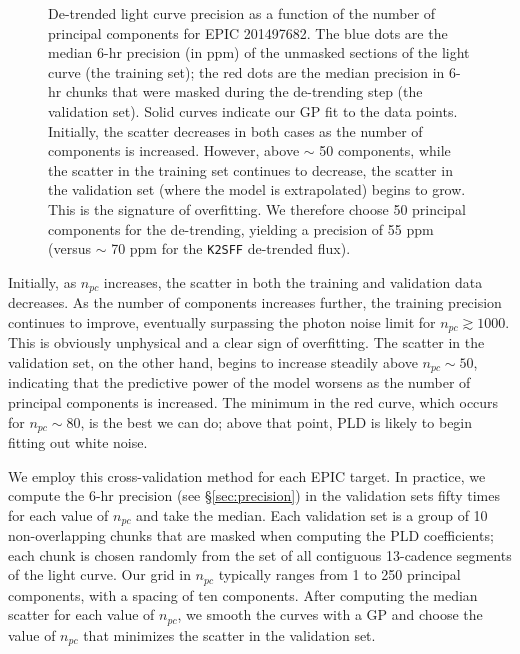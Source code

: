 \documentclass[]{emulateapj}
\begin{document}
\begin{figure}[h]
  \begin{center}
       \caption{De-trended light curve precision as a function of the number of principal
                components for EPIC 201497682. The blue dots are the median
                6-hr precision (in ppm) of the unmasked sections of the light curve (the training set); 
                the red dots are the median 
                precision in 6-hr chunks that were masked during the de-trending step
                (the validation set). Solid curves indicate our GP fit to the data points.
                Initially, the scatter decreases in both cases as the 
                number of components is increased. However, above $\sim$ 50 components, while the
                scatter in the training set continues to decrease, the scatter in the validation set (where 
                the model is extrapolated) begins to grow. This is the signature
                of overfitting. We therefore choose 50 principal components for the
                de-trending, yielding a precision of 55 ppm (versus $\sim$ 70 ppm for the
                \texttt{K2SFF} de-trended flux).}
     \label{fig:scatter}
  \end{center}
\end{figure}

Initially, as $n_{pc}$ increases, the scatter in both the training and validation data
decreases. As the number of components increases further, the training precision continues to improve,
eventually surpassing the photon noise limit for $n_{pc} \gtrsim 1000$. This is obviously unphysical and a
clear sign of overfitting. The scatter in the validation set, on the other hand, begins to increase steadily above $n_{pc} \sim 50$,
indicating that the predictive power of the model worsens as the number of principal components is increased.
The minimum in the red curve, which occurs for $n_{pc} \sim 80$, is the best we can do; above that point, PLD
is likely to begin fitting out white noise.

We employ this cross-validation method for each EPIC target. In practice, we compute the 6-hr precision
(see \S\ref{sec:precision}) in the validation sets fifty times for each value of $n_{pc}$ and take the median. 
Each validation set is a group of 10 non-overlapping chunks that are masked when computing the PLD coefficients; each
chunk is chosen randomly from the set of all contiguous 13-cadence segments of the light curve. 
Our grid in $n_{pc}$ typically ranges from 1 to 250 principal components, with a spacing of ten components.
After computing the median scatter for each value of $n_{pc}$, we smooth the curves with a GP and choose the 
value of $n_{pc}$ that minimizes the scatter in the validation set.
\end{document}
